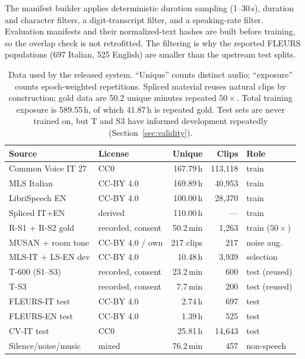 \documentclass{article}
\begin{document}
The manifest builder applies deterministic duration sampling (1--30\,s), duration and character
filters, a digit-transcript filter, and a speaking-rate filter. Evaluation manifests and their
normalized-text hashes are built before training, so the overlap check is not retrofitted. The
filtering is why the reported FLEURS populations (697 Italian, 525 English) are smaller than the
upstream test splits.

\begin{table}[t]
\centering
\small
\setlength{\tabcolsep}{3.4pt}
\caption{Data used by the released system. ``Unique'' counts distinct audio; ``exposure'' counts
epoch-weighted repetitions. Spliced material reuses natural clips by construction; gold data are
50.2 unique minutes repeated $50\times$. Total training exposure is 589.55\,h, of which 41.87\,h is
repeated gold. Test sets are never trained on, but T and S3 have informed development repeatedly
(Section~\ref{sec:validity}).}
\label{tab:data}
\begin{tabular}{@{}l>{\raggedright\arraybackslash}p{2.45cm}rrl@{}}
\toprule
Source & License & Unique & Clips & Role \\
\midrule
Common Voice IT 27 & CC0 & 167.79\,h & 113{,}118 & train \\
MLS Italian & CC-BY 4.0 & 169.89\,h & 40{,}953 & train \\
LibriSpeech EN & CC-BY 4.0 & 100.00\,h & 28{,}370 & train \\
Spliced IT+EN & derived & 110.00\,h & --- & train \\
R-S1 + R-S2 gold & recorded, consent & 50.2\,min & 1{,}263 & train ($50\times$) \\
MUSAN + room tone & CC-BY 4.0 / own & 217 clips & 217 & noise aug. \\
\midrule
MLS-IT + LS-EN dev & CC-BY 4.0 & 10.48\,h & 3{,}939 & selection \\
T-600 (S1--S3) & recorded, consent & 23.2\,min & 600 & test (reused) \\
T-S3 & recorded, consent & 7.7\,min & 200 & test (reused) \\
FLEURS-IT test & CC-BY 4.0 & 2.74\,h & 697 & test \\
FLEURS-EN test & CC-BY 4.0 & 1.39\,h & 525 & test \\
CV-IT test & CC0 & 25.81\,h & 14{,}643 & test \\
Silence/noise/music & mixed & 76.2\,min & 457 & non-speech \\
\bottomrule
\end{tabular}
\end{table}
\end{document}
